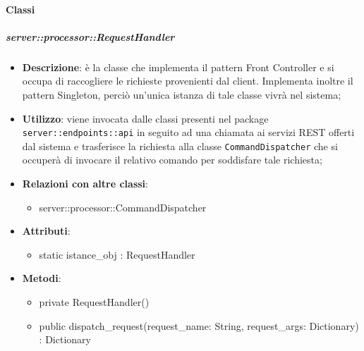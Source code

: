   \paragraph{Classi} %

    \subparagraph{server::processor::RequestHandler} %
    \label{subp:bdsm_app_server_processor_requesthandler}
    \begin{itemize}
      \item \textbf{Descrizione}: è la classe che implementa il pattern Front Controller e si occupa di raccogliere le richieste provenienti dal client. Implementa inoltre il pattern Singleton, perciò un'unica istanza di tale classe vivrà nel sistema;
      \item \textbf{Utilizzo}: viene invocata dalle classi presenti nel package \texttt{server::endpoints::api} in seguito ad una chiamata ai servizi REST offerti dal sistema e trasferisce la richiesta alla classe \texttt{CommandDispatcher} che si occuperà di invocare il relativo comando per soddisfare tale richiesta;
      \item \textbf{Relazioni con altre classi}:
        \begin{itemize}
          \item server::processor::CommandDispatcher
        \end{itemize}
		\item \textbf{Attributi}:
        	\begin{itemize}
          		\item static istance\_obj : RequestHandler
        	\end{itemize}
		\item \textbf{Metodi}:
        	\begin{itemize}
         		 \item private RequestHandler()
         		 \item public dispatch\_request(request_name: String, request_args: Dictionary) : Dictionary
							\begin{description}

\end{description}
\end{itemize}
\end{itemize}
